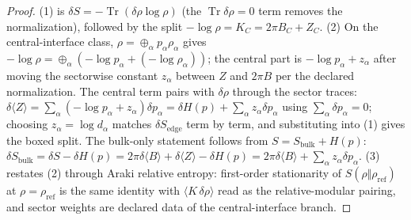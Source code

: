 \documentclass[11pt]{article}
\begin{document}
\begin{proof}
(1) is \(\delta S=-\operatorname{Tr}(\delta\rho\log\rho)\) (the
\(\operatorname{Tr}\delta\rho=0\) term removes the normalization), followed
by the split \(-\log\rho=K_C=2\pi B_C+Z_C\). (2) On the central-interface
class, \(\rho=\oplus_\alpha p_\alpha\rho_\alpha\) gives
\(-\log\rho=\oplus_\alpha(-\log p_\alpha+(-\log\rho_\alpha))\); the central
part is \(-\log p_\alpha+z_\alpha\) after moving the sectorwise constant
\(z_\alpha\) between \(Z\) and \(2\pi B\) per the declared normalization.
The central term pairs with \(\delta\rho\) through the sector traces:
\(\delta\langle Z\rangle=\sum_\alpha(-\log p_\alpha+z_\alpha)\delta p_\alpha
=\delta H(p)+\sum_\alpha z_\alpha\delta p_\alpha\)
using \(\sum_\alpha\delta p_\alpha=0\); choosing
\(z_\alpha=\log d_\alpha\) matches \(\delta S_{\mathrm{edge}}\) term by term,
and substituting into (1) gives the boxed split. The bulk-only statement
follows from \(S=S_{\mathrm{bulk}}+H(p)\):
\(\delta S_{\mathrm{bulk}}=\delta S-\delta H(p)
=2\pi\delta\langle B\rangle+\delta\langle Z\rangle-\delta H(p)
=2\pi\delta\langle B\rangle+\sum_\alpha z_\alpha\delta p_\alpha\). (3) restates (2) through Araki relative entropy: first-order
stationarity of \(S(\rho\Vert\rho_{\mathrm{ref}})\) at
\(\rho=\rho_{\mathrm{ref}}\) is the same identity with
\(\langle K\,\delta\rho\rangle\) read as the relative-modular pairing, and
sector weights are declared data of the central-interface branch.
\end{proof}
\end{document}
